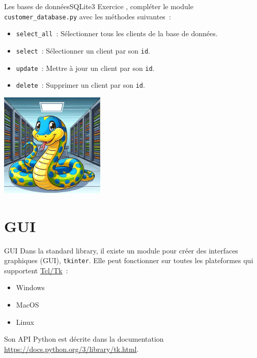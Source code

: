 \documentclass{beamer}
\begin{document}
    \begin{frame}{Les bases de données}{SQLite3}
        Exercice \execcounterdispinc{}, compléter le module \lstinline{customer_database.py} avec les méthodes suivantes{}~:
        \begin{itemize}
            \item \lstinline{select_all}~: Sélectionner tous les clients de la base de données.
            \item \lstinline{select}~: Sélectionner un client par son \lstinline{id}.
            \item \lstinline{update}~: Mettre à jour un client par son \lstinline{id}.
            \item \lstinline{delete}~: Supprimer un client par son \lstinline{id}.
        \end{itemize}
        \bigbreak
        \centering
        \includegraphics[width=5cm]{image/python-in-dc}
    \end{frame}


    \section{GUI}\label{sec:ui}

    \begin{frame}{GUI}
        Dans la standard library, il existe un module pour créer des interfaces graphiques (GUI), \lstinline{tkinter}.
        \bigbreak
        Elle peut fonctionner sur toutes les plateformes qui supportent \href{https://www.tcl.tk/}{Tcl/Tk}~:
        \begin{itemize}
            \item Windows
            \item MacOS
            \item Linux
        \end{itemize}
        Son API Python est décrite dans la documentation \url{https://docs.python.org/3/library/tk.html}.
    \end{frame}
\end{document}
